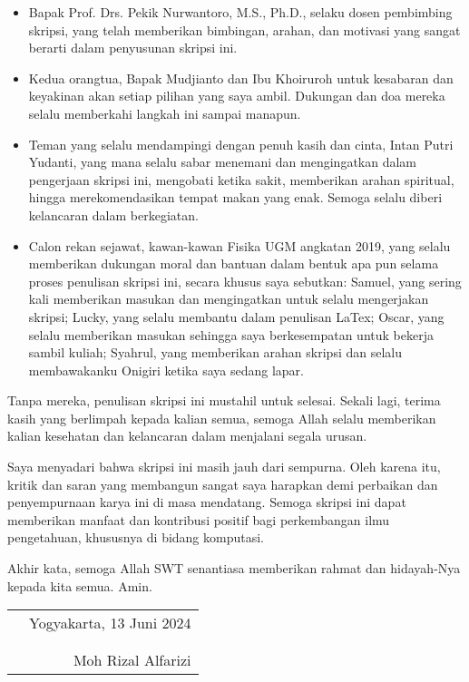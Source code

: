 \documentclass{skripsiactugm}
\begin{document}
\begin{itemize}
	\item Bapak Prof. Drs. Pekik Nurwantoro, M.S., Ph.D., selaku dosen pembimbing skripsi, yang telah memberikan bimbingan, arahan, dan motivasi yang sangat berarti dalam penyusunan skripsi ini.
	\item Kedua orangtua, Bapak Mudjianto dan Ibu Khoiruroh untuk kesabaran dan keyakinan akan setiap pilihan yang saya ambil.
	      Dukungan dan doa mereka selalu memberkahi langkah ini sampai manapun.
	\item Teman yang selalu mendampingi dengan penuh kasih dan cinta, Intan Putri Yudanti, yang mana selalu sabar menemani dan mengingatkan dalam pengerjaan skripsi ini, mengobati ketika sakit, memberikan arahan spiritual, hingga merekomendasikan tempat makan yang enak. Semoga selalu diberi kelancaran dalam berkegiatan.
	\item Calon rekan sejawat, kawan-kawan Fisika UGM angkatan 2019, yang selalu memberikan dukungan moral dan bantuan dalam bentuk apa pun selama proses penulisan skripsi ini, secara khusus saya sebutkan: Samuel, yang sering kali memberikan masukan dan mengingatkan untuk selalu mengerjakan skripsi; Lucky, yang selalu membantu dalam penulisan LaTex; Oscar, yang selalu memberikan masukan sehingga saya berkesempatan untuk bekerja sambil kuliah; Syahrul, yang memberikan arahan skripsi dan selalu membawakanku Onigiri ketika saya sedang lapar.
\end{itemize}

\noindent
Tanpa mereka, penulisan skripsi ini mustahil untuk selesai. Sekali lagi, terima kasih yang berlimpah kepada kalian semua, semoga Allah selalu memberikan kalian kesehatan dan kelancaran dalam menjalani segala urusan.

Saya menyadari bahwa skripsi ini masih jauh dari sempurna. Oleh karena itu, kritik dan saran yang membangun sangat saya harapkan demi perbaikan dan penyempurnaan karya ini di masa mendatang. Semoga skripsi ini dapat memberikan manfaat dan kontribusi positif bagi perkembangan ilmu pengetahuan, khususnya di bidang komputasi.

Akhir kata, semoga Allah SWT senantiasa memberikan rahmat dan hidayah-Nya kepada kita semua. Amin.

\vspace{0.8cm}

\begin{tabular}{p{7cm}r}
	 & Yogyakarta, 13 Juni 2024 \\
	 &                          \\
	 &                          \\
	 & Moh Rizal Alfarizi
\end{tabular}
\end{document}
